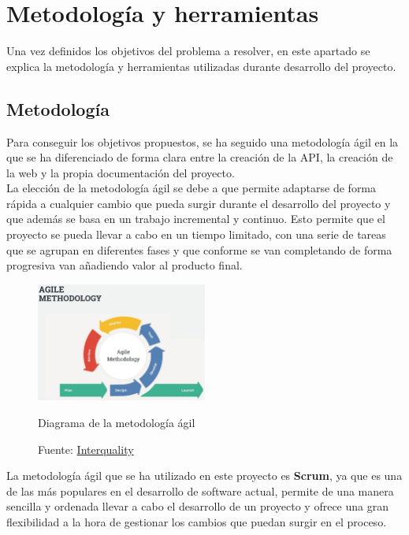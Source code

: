 \section{Metodología y herramientas}\label{sec:metodologia-y-herramientas-de-seguimiento}

Una vez definidos los objetivos del problema a resolver, en este apartado se explica la metodología y herramientas
utilizadas durante desarrollo del proyecto.

\subsection{Metodología}\label{subsec:metodologia}

Para conseguir los objetivos propuestos, se ha seguido una metodología ágil en la que se ha diferenciado de forma
clara entre la creación de la API, la creación de la web y la propia documentación del proyecto. \\

La elección de la metodología ágil se debe a que permite adaptarse de forma rápida a cualquier cambio que pueda
surgir durante el desarrollo del proyecto y que además se basa en un trabajo incremental y continuo. Esto permite
que el proyecto se pueda llevar a cabo en un tiempo limitado, con una serie de tareas que se agrupan en
diferentes fases y que conforme se van completando de forma progresiva van añadiendo valor al producto final. \\

\begin{figure}[H]
\centering
\includegraphics[width=0.5\textwidth]{imgs/metodologia_agil.jpg}
    \caption{Diagrama de la metodología ágil}
    \label{fig:metodologia_agil}
    \caption*{Fuente: \href{https://interqualitybg.com/en/resources/scrum-and-agile-resources/agile-methodology}{Interquality}}
\end{figure}

La metodología ágil que se ha utilizado en este proyecto es \textbf{Scrum}, ya que es una de las más populares en el
desarrollo de software actual, permite de una manera sencilla y ordenada llevar a cabo el desarrollo de un proyecto y
ofrece una gran flexibilidad a la hora de gestionar los cambios que puedan surgir en el proceso. \\

